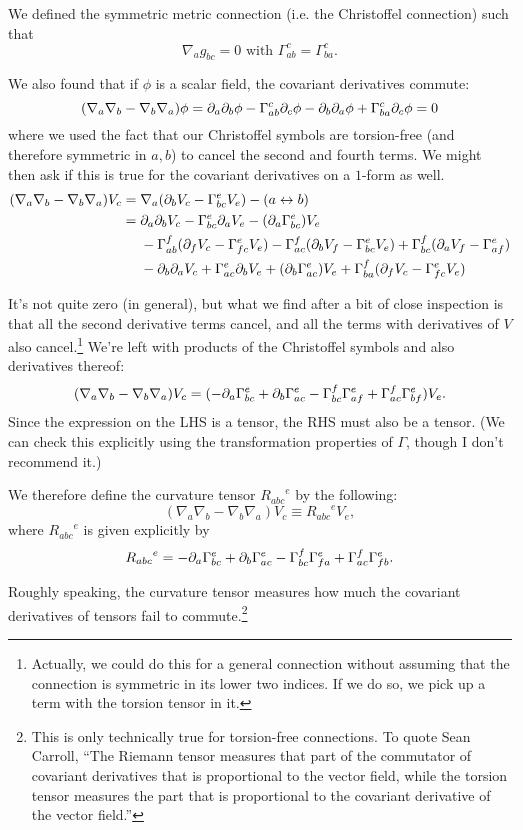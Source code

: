 We defined the symmetric metric connection (i.e. the Christoffel connection) such that
$$\nabla_a g_{bc}=0\text{ with } \Gamma^c_{ab}=\Gamma^{c}_{ba}.$$

We also found that if $\phi$ is a scalar field, the covariant derivatives commute:
$$(\nabla_a \nabla_b - \nabla_b \nabla_a)\phi = \partial_a \partial_b \phi - \Gamma^c_{ab} \partial_c \phi - \partial_b \partial_a \phi+ \Gamma^c_{ba}\partial_c\phi =0$$
where we used the fact that our Christoffel symbols are torsion-free (and therefore symmetric in $a,b$) to cancel the second and fourth terms.
We might then ask if this is true for the covariant derivatives on a $1$-form as well.
\begin{align*}
(\nabla_a \nabla_b - \nabla_b \nabla_a)V_c ={}&
\nabla_a(\partial_b V_c - \Gamma^e_{bc} V_e) - (a\leftrightarrow b)\\
={}&\partial_a\partial_b V_c - \Gamma^e_{bc} \partial_a V_e - (\partial_a \Gamma^e_{bc})V_e \\
&- \Gamma^f_{ab} (\partial_f V_c- \Gamma^e_{fc} V_e) -\Gamma^f_{ac}(\partial_b V_f - \Gamma^e_{bc}V_e) +\Gamma^f_{bc}(\partial_a V_f -\Gamma^e_{af})\\
&-\partial_b\partial_a V_c + \Gamma^e_{ac}\partial_b V_e + (\partial_b \Gamma^e_{ac})V_e +\Gamma^f_{ba}(\partial_f V_c - \Gamma^e_{fc} V_e)
\end{align*}

It's not quite zero (in general), but what we find after a bit of close inspection is that all the second derivative terms cancel, and all the terms with derivatives of $V$ also cancel.\footnote{Actually, we could do this for a general connection without assuming that the connection is symmetric in its lower two indices. If we do so, we pick up a term with the torsion tensor in it.} We're left with products of the Christoffel symbols and also derivatives thereof:
$$(\nabla_a\nabla_b - \nabla_b \nabla_a)V_c=(-\partial_a \Gamma^e_{bc}+\partial_b \Gamma^e_{ac} - \Gamma^f_{bc} \Gamma^e_{af}+\Gamma^f_{ac} \Gamma^e_{bf}) V_e.$$
Since the expression on the LHS is a tensor, the RHS must also be a tensor. (We can check this explicitly using the transformation properties of $\Gamma$, though I don't recommend it.)

\begin{defn}
We therefore define the curvature tensor ${R_{abc}}^e$ by the following:
\begin{equation}\label{ricciid}
    (\nabla_a \nabla_b - \nabla_b \nabla_a)V_c\equiv {R_{abc}}^e V_e,
\end{equation}
where ${R_{abc}}^e$ is given explicitly by
$${R_{abc}}^e = -\partial_a \Gamma^e_{bc} +\partial_b \Gamma^e_{ac}-\Gamma^f_{bc} \Gamma^e_{fa}+\Gamma^f_{ac} \Gamma^e_{fb}.$$

Roughly speaking, the curvature tensor measures how much the covariant derivatives of tensors fail to commute.\footnote{This is only technically true for torsion-free connections. To quote Sean Carroll, ``The Riemann tensor measures that part of the commutator of covariant derivatives that is proportional to the vector field, while the torsion tensor measures the part that is proportional to the covariant derivative of the vector field.''}
\end{defn}

